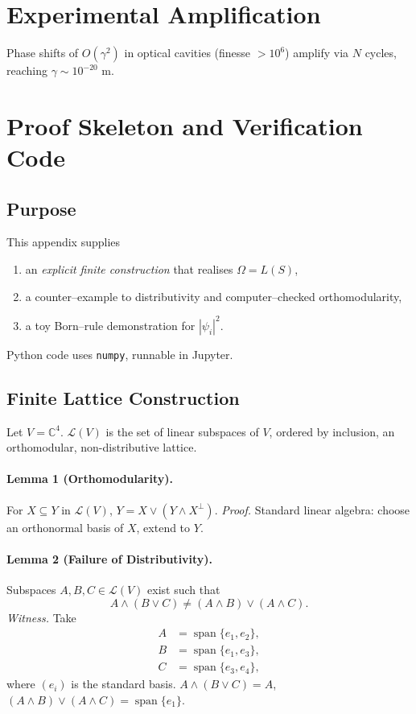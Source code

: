 \documentclass[aps,prx,twocolumn]{revtex4-2}
\begin{document}
\begin{widetext}
\begin{appendix}
\section{Experimental Amplification}
\label{app:amp}
Phase shifts of $O(\gamma^2)$ in optical cavities (finesse $>10^6$) amplify via $N$ cycles, reaching $\gamma \sim 10^{-20}$ m.

\section{Proof Skeleton and Verification Code}
\label{app:proof}
\subsection*{Purpose}
This appendix supplies
\begin{enumerate}
    \item an \emph{explicit finite construction} that realises $\Omega=L(S)$,
    \item a counter--example to distributivity and computer--checked orthomodularity,
    \item a toy Born--rule demonstration for $|\psi_i|^2$.
\end{enumerate}
Python code uses \texttt{numpy}, runnable in Jupyter.

\subsection*{Finite Lattice Construction}
Let $V=\mathbb{C}^4$. $\mathcal{L}(V)$ is the set of linear subspaces of $V$, ordered by inclusion, an orthomodular, non-distributive lattice.

\paragraph{Lemma 1 (Orthomodularity).} For $X \subseteq Y$ in $\mathcal{L}(V)$, $Y = X \lor (Y \land X^{\perp})$.
\emph{Proof.} Standard linear algebra: choose an orthonormal basis of $X$, extend to $Y$.

\paragraph{Lemma 2 (Failure of Distributivity).} Subspaces $A, B, C \in \mathcal{L}(V)$ exist such that
\[
A \land (B \lor C) \neq (A \land B) \lor (A \land C).
\]
\emph{Witness.} Take
\[
\begin{aligned}
A &= \operatorname{span}\{e_1, e_2\}, \\
B &= \operatorname{span}\{e_1, e_3\}, \\
C &= \operatorname{span}\{e_3, e_4\},
\end{aligned}
\]
where $(e_i)$ is the standard basis. $A \land (B \lor C) = A$, $(A \land B) \lor (A \land C) = \operatorname{span}\{e_1\}$.


\end{appendix}
\end{widetext}
\end{document}
